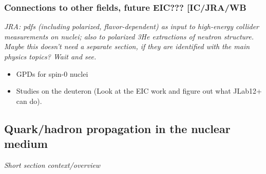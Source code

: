 \subsubsection{Connections to other fields, future EIC??? [IC/JRA/WB}
\textit{JRA: pdfs (including polarized, flavor-dependent) as input to high-energy collider measurements on nuclei; also to polarized 3He extractions of neutron structure. Maybe this doesn't need a separate section, if they are identified with the main physics topics? Wait and see.}

\begin{itemize}
    \item GPDs for spin-0 nuclei
    \item Studies on the deuteron (Look at the EIC work and figure out what JLab12+ can do).
\end{itemize}


\subsection{Quark/hadron propagation in the nuclear medium}
\textit{Short section context/overview}

